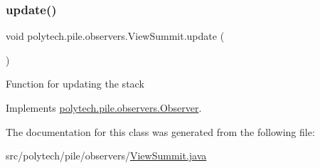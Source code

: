 \subsubsection{\texorpdfstring{update()}{update()}}
{\footnotesize\ttfamily void polytech.\+pile.\+observers.\+View\+Summit.\+update (\begin{DoxyParamCaption}{ }\end{DoxyParamCaption})}

Function for updating the stack 

Implements \hyperlink{interfacepolytech_1_1pile_1_1observers_1_1_observer_afeb6abcefc917edee5d1f33bfb76e6b1}{polytech.\+pile.\+observers.\+Observer}.



The documentation for this class was generated from the following file\+:\begin{DoxyCompactItemize}
\item 
src/polytech/pile/observers/\hyperlink{_view_summit_8java}{View\+Summit.\+java}\end{DoxyCompactItemize}
